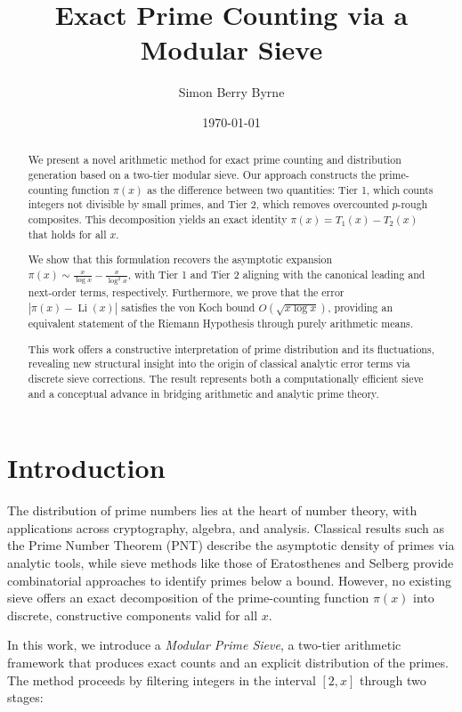 \documentclass[11pt]{article}
\title{Exact Prime Counting via a Modular Sieve}
\author{Simon Berry Byrne}
\date{\today}
\begin{document}
	
	\maketitle
		
		
	\begin{abstract}
		We present a novel arithmetic method for exact prime counting and distribution generation based on a two-tier modular sieve. Our approach constructs the prime-counting function $\pi(x)$ as the difference between two quantities: Tier 1, which counts integers not divisible by small primes, and Tier 2, which removes overcounted $p$-rough composites. This decomposition yields an exact identity $\pi(x) = T_1(x) - T_2(x)$ that holds for all $x$.
		
		We show that this formulation recovers the asymptotic expansion $\pi(x) \sim \frac{x}{\log x} - \frac{x}{\log^2 x}$, with Tier 1 and Tier 2 aligning with the canonical leading and next-order terms, respectively. Furthermore, we prove that the error $|\pi(x) - \operatorname{Li}(x)|$ satisfies the von Koch bound $O(\sqrt{x \log x})$, providing an equivalent statement of the Riemann Hypothesis through purely arithmetic means.
		
		This work offers a constructive interpretation of prime distribution and its fluctuations, revealing new structural insight into the origin of classical analytic error terms via discrete sieve corrections. The result represents both a computationally efficient sieve and a conceptual advance in bridging arithmetic and analytic prime theory.
	\end{abstract}
	
	
	\section{Introduction}
	
	The distribution of prime numbers lies at the heart of number theory, with applications across cryptography, algebra, and analysis. Classical results such as the Prime Number Theorem (PNT) describe the asymptotic density of primes via analytic tools, while sieve methods like those of Eratosthenes and Selberg provide combinatorial approaches to identify primes below a bound. However, no existing sieve offers an exact decomposition of the prime-counting function $\pi(x)$ into discrete, constructive components valid for all $x$.
	
	In this work, we introduce a \textit{Modular Prime Sieve}, a two-tier arithmetic framework that produces exact counts and an explicit distribution of the primes. The method proceeds by filtering integers in the interval $[2, x]$ through two stages:
	
\end{document}
